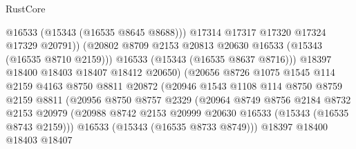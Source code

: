\begin{lexlean}{RustCore}
\begin{coremodule}
                                    @16533
                                    (@15343 (@16535 @8645 @8688)))
                                  @17314
                                  @17317
                                  @17320
                                  @17324
                                  @17329
                                  @20791))
                              (@20802
                                @8709
                                @2153
                                @20813
                                @20630
                                @16533
                                (@15343 (@16535 @8710 @2159)))
                              @16533
                              (@15343 (@16535 @8637 @8716)))
                            @18397
                            @18400
                            @18403
                            @18407
                            @18412
                            @20650)
                          (@20656
                            @8726
                            @1075
                            @1545
                            @114
                            @2159
                            @4163
                            @8750
                            @8811
                            @20872
                            (@20946
                              @1543
                              @1108
                              @114
                              @8750
                              @8759
                              @2159
                              @8811
                              (@20956
                                @8750
                                @8757
                                @2329
                                (@20964
                                  @8749
                                  @8756
                                  @2184
                                  @8732
                                  @2153
                                  @20979
                                  (@20988
                                    @8742
                                    @2153
                                    @20999
                                    @20630
                                    @16533
                                    (@15343 (@16535 @8743 @2159)))
                                  @16533
                                  (@15343 (@16535 @8733 @8749)))
                                @18397
                                @18400
                                @18403
                                @18407

\end{coremodule}
\end{lexlean}
